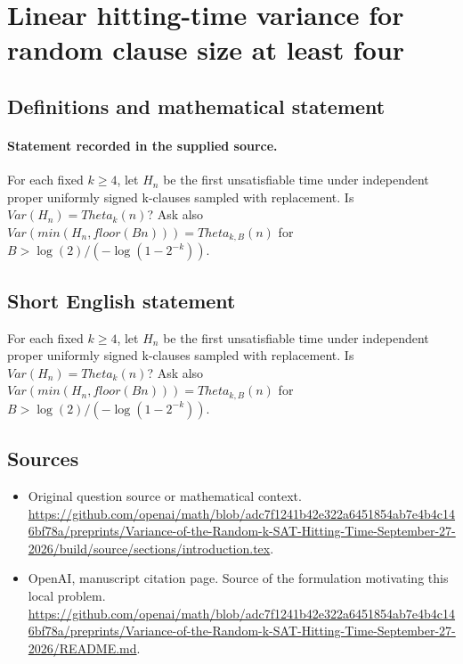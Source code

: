 \documentclass[11pt]{article}
\begin{document}
\section*{Linear hitting-time variance for random clause size at least four}\label{30007384}
\subsection{Definitions and mathematical statement}
\paragraph{Statement recorded in the supplied source.}
For each fixed $k\geq 4$, let $H_n$ be the first unsatisfiable time under independent proper uniformly signed k-clauses sampled with replacement. Is $Var(H_n)=Theta_k(n)$? Ask also $Var(min(H_n,floor(Bn)))=Theta_{k,B}(n)$ for $B>\log (2)/(-\log (1-2^{-k}))$.
\subsection{Short English statement}
For each fixed $k\geq 4$, let $H_n$ be the first unsatisfiable time under independent proper uniformly signed k-clauses sampled with replacement. Is $Var(H_n)=Theta_k(n)$? Ask also $Var(min(H_n,floor(Bn)))=Theta_{k,B}(n)$ for $B>\log (2)/(-\log (1-2^{-k}))$.
\subsection{Sources}
\begin{itemize}
\item[S1] Original question source or mathematical context.
\url{https://github.com/openai/math/blob/adc7f1241b42e322a6451854ab7e4b4c146bf78a/preprints/Variance-of-the-Random-k-SAT-Hitting-Time-September-27-2026/build/source/sections/introduction.tex}.
\item[S2] OpenAI, manuscript citation page. Source of the formulation motivating this local problem.
\url{https://github.com/openai/math/blob/adc7f1241b42e322a6451854ab7e4b4c146bf78a/preprints/Variance-of-the-Random-k-SAT-Hitting-Time-September-27-2026/README.md}.
\end{itemize}
\end{document}
